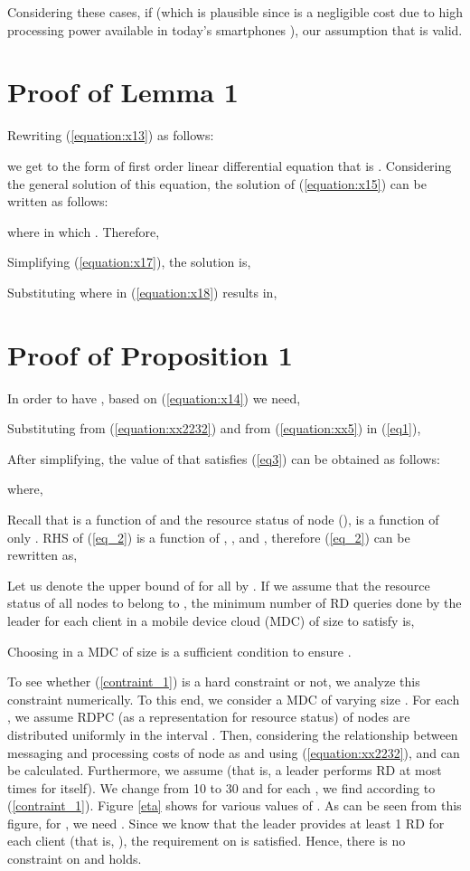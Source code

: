 \documentclass[journal,12pt, onecolumn]{IEEEtran}
\begin{document}
Considering these cases, if  (which is plausible since  is a negligible cost due to high processing power available in today's smartphones \cite{x29}), our assumption that  is valid. 



\section{Proof of Lemma 1}
\label{p_l1}
Rewriting (\ref{equation:x13}) as follows:

we get to the form of first order linear differential equation that is . Considering the general solution of this equation, the solution of (\ref{equation:x15}) can be written as follows:

where  in which . Therefore,

Simplifying (\ref{equation:x17}), the solution is,
 
Substituting  where  in (\ref{equation:x18}) results in,
 

\section{Proof of Proposition 1}
\label{p_p1}
In order to have , based on (\ref{equation:x14}) we need,
 
Substituting  from (\ref{equation:xx2232}) and  from (\ref{equation:xx5}) in (\ref{eq1}),


After simplifying, the value of  that satisfies (\ref{eq3}) can be obtained as follows:
 
where,


Recall that  is a function of  and the resource status of node  (),  is a function of only . RHS of (\ref{eq_2}) is a function of , , and , therefore (\ref{eq_2}) can be rewritten as, 
 

Let us denote the upper bound of  for all  by . If we assume that the resource status of all nodes to belong to , the minimum number of RD queries done by the leader for each client in a mobile device cloud (MDC) of size  to satisfy  is,

Choosing  in a MDC of size  is a sufficient condition to ensure  .  

To see whether (\ref{contraint_1}) is a hard constraint or not, we analyze this constraint numerically. To this end, we consider a MDC of varying size . For each , we assume RDPC (as a representation for resource status) of nodes are distributed uniformly in the interval . Then, considering the relationship between messaging and processing costs of node  as  and using (\ref{equation:xx2232}),  and  can be calculated. Furthermore, we assume  (that is, a leader performs RD at most  times for itself). We change  from 10 to 30 and for each , we find  according to (\ref{contraint_1}). Figure \ref{eta} shows  for various values of . As can be seen from this figure, for , we need . Since we know that the leader provides at least 1 RD for each client (that is, ), the requirement on  is satisfied. Hence, there is no constraint on  and  holds.
\end{document}
